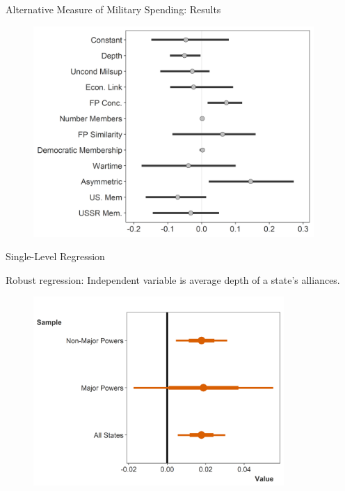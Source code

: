 \documentclass[12pt]{beamer}
\begin{document}
\begin{frame}{Alternative Measure of Military Spending: Results}

\begin{figure}[htbp]
	\centering
		\includegraphics[width=0.95\textwidth]{beta-intervals-post45.png}
\end{figure}

\end{frame}



\begin{frame}{Single-Level Regression}

Robust regression: Independent variable is average depth of a state's alliances. 

\begin{figure}[htbp]
	\centering
		\includegraphics[width=0.85\textwidth]{robust-reg-coef.png}
\end{figure}


\end{frame}
\end{document}

